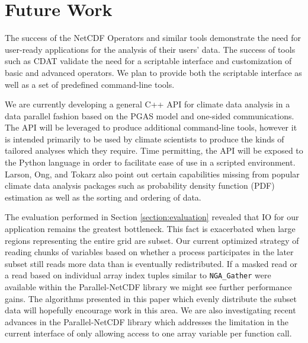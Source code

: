 \section{Future Work}
\label{section:future}

The success of the NetCDF Operators\cite{NCO} and similar tools demonstrate
the need for user-ready applications for the analysis of their users' data.  
The success of tools such as CDAT\cite{CDAT} validate the need for a
scriptable interface and customization of basic and advanced operators.  We
plan to provide both the scriptable interface as well as a set of predefined
command-line tools.

We are currently developing a general C++ API for climate data analysis in a
data parallel fashion based on the PGAS model and one-sided communications.
The API will be leveraged to produce additional command-line tools, however it
is intended primarily to be used by climate scientists to produce the kinds of
tailored analyses which they require.  Time permitting, the API will be
exposed to the Python language in order to facilitate ease of use in a
scripted environment.  Larson, Ong, and Tokarz also point out certain
capabilities missing from popular climate data analysis packages such as
probability density function (PDF) estimation as well as the sorting and
ordering of data.

The evaluation performed in Section \ref{section:evaluation} revealed that IO
for our application remains the greatest bottleneck.  This fact is exacerbated
when large regions representing the entire grid are subset.  Our current
optimized strategy of reading chunks of variables based on whether a process
participates in the later subset still reads more data than is eventually
redistributed.  If a masked read or a read based on individual array index
tuples similar to \verb+NGA_Gather+ were available within the Parallel-NetCDF
library we might see further performance gains.  The algorithms presented in
this paper which evenly distribute the subset data will hopefully encourage
work in this area.  We are also investigating recent advances in the
Parallel-NetCDF library \cite{PNETCDFOPT} which addresses the limitation in
the current interface of only allowing access to one array variable per
function call.
